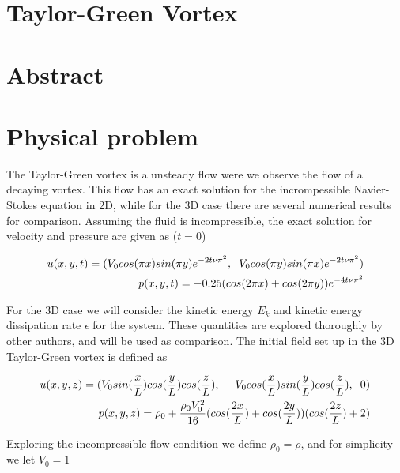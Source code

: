 \documentclass[a4paper,norsk]{article}
\begin{document}
\maketitle
\section*{Taylor-Green Vortex}

\section*{Abstract}

\section*{Physical problem}
The Taylor-Green vortex is a unsteady flow were we observe the flow of a decaying
vortex. This flow has an exact solution for the incrompessible Navier-Stokes equation in 2D, while for the 3D
case there are several numerical results for comparison.
Assuming the fluid is incompressible, the exact solution for velocity and pressure are given as ($t=0$)

\begin{align}
u(x,y,t) = (V_{0} cos(\pi x)sin(\pi y) e^{-2 t \nu \pi^{2} }, \hspace{2mm} V_{0}cos(\pi y)sin(\pi x) e^{-2 t \nu \pi^2} ) \\
p(x,y,t) = -0.25(cos(2\pi x) + cos(2 \pi y) ) e^{-4 t \nu \pi^2}
\end{align}


For the 3D case we will consider the kinetic energy $E_k$ and kinetic energy dissipation rate $\epsilon$  for the system. These quantities are 
explored thoroughly by other authors, and will be used as comparison. The initial field set up in the 3D Taylor-Green vortex is defined as 

\begin{align}
u(x,y,z) = ( V_{0}sin(\frac{x}{L}) cos(\frac{y}{L}) cos(\frac{z}{L}), \hspace{2mm}-V_{0}cos(\frac{x}{L})sin(\frac{y}{L})cos(\frac{z}{L}), \hspace{2mm} 0 )\\
p(x,y,z) = \rho_{0} + \frac{\rho_0 V_0^2}{16}(cos(\frac{2x}{L}) + cos(\frac{2y}{L}))(cos(\frac{2z}{L}) + 2)
\end{align}

Exploring the incompressible flow condition we define $\rho_0 = \rho$, and for simplicity we let $V_0 = 1$
\end{document}
